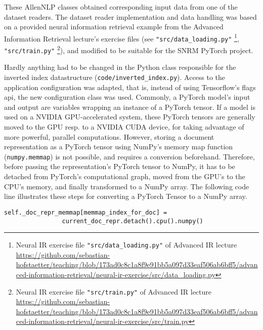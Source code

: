 These AllenNLP classes obtained corresponding input data from one of the dataset readers.
The dataset reader implementation and data handling was based on a provided neural information retrieval 
    example from the Advanced Information Retrieval lecture's exercise files
    (see \texttt{"src/data\_loading.py"}
    \footnote{Neural IR exercise file \texttt{"src/data\_loading.py"} of Advanced IR lecture \url{https://github.com/sebastian-hofstaetter/teaching/blob/173ad0c8c1a8f9e91bb5a097d33eaf506ab6bff5/advanced-information-retrieval/neural-ir-exercise/src/data_loading.py}},
    \texttt{"src/train.py"}
    \footnote{Neural IR exercise file \texttt{"src/train.py"} of Advanced IR lecture \url{https://github.com/sebastian-hofstaetter/teaching/blob/173ad0c8c1a8f9e91bb5a097d33eaf506ab6bff5/advanced-information-retrieval/neural-ir-exercise/src/train.py}}),
    and modified to be suitable for the SNRM PyTorch project.

Hardly anything had to be changed in the Python class responsible for the inverted index datastructure 
    (\texttt{code/inverted\_index.py}).
Access to the application configuration was adapted, that is, instead of using Tensorflow's flags api, the 
    new configuration class was used.
Commonly, a PyTorch model's input and output are variables wrapping an instance of a PyTorch tensor.
If a model is used on a NVIDIA GPU-accelerated system, these PyTorch tensors are generally moved to 
    the GPU resp. to a NVIDIA CUDA device, for taking advantage of more powerful, parallel computations.
However, storing a document representation as a PyTorch tensor using NumPy's memory map function 
    (\texttt{numpy.memmap}) is not possible, and requires a conversion beforehand.
Therefore, before passing the representation's PyTorch tensor to NumPy, 
    it has to be detached from PyTorch's computational graph,
    moved from the GPU's to the CPU's memory, and finally transformed to a NumPy array.
The following code line illustrates these steps for converting a PyTorch Tensor to a NumPy array.
\begin{verbatim}
self._doc_repr_memmap[memmap_index_for_doc] = 
                current_doc_repr.detach().cpu().numpy()
\end{verbatim}

